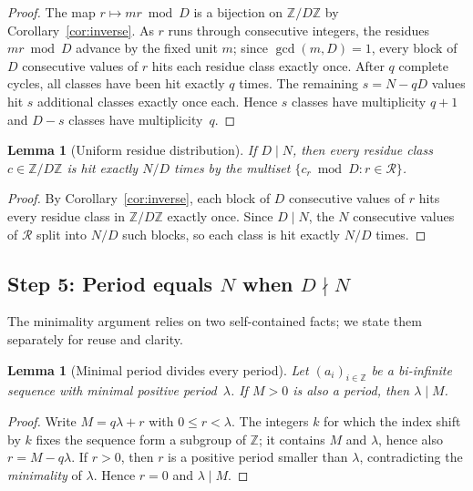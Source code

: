 \documentclass[11pt,reqno]{amsart}
\theoremstyle{plain}
\newtheorem{lemma}[theorem]{Lemma}
\theoremstyle{definition}
\theoremstyle{remark}
\begin{document}
\begin{proof}
The map \(r \mapsto mr \bmod D\) is a bijection on
\(\mathbb{Z}/D\mathbb{Z}\) by Corollary~\ref{cor:inverse}.
As \(r\) runs through consecutive integers, the residues \(mr \bmod D\)
advance by the fixed unit \(m\); since \(\gcd(m, D) = 1\), every block of
\(D\) consecutive values of \(r\) hits each residue class exactly once.
After \(q\) complete cycles, all classes have been hit exactly \(q\) times.
The remaining \(s = N - qD\) values hit \(s\) additional classes exactly once
each.
Hence \(s\) classes have multiplicity \(q + 1\) and \(D - s\) classes have
multiplicity~\(q\).
\end{proof}

\begin{lemma}[Uniform residue distribution]\label{lem:uniform}
If \(D \mid N\), then every residue class \(c \in \mathbb{Z}/D\mathbb{Z}\) is
hit exactly \(N/D\) times by the multiset
\(\{c_r \bmod D : r \in \mathcal{R}\}\).
\end{lemma}

\begin{proof}
By Corollary~\ref{cor:inverse}, each block of \(D\) consecutive values of
\(r\) hits every residue class in \(\mathbb{Z}/D\mathbb{Z}\) exactly once.
Since \(D \mid N\), the \(N\) consecutive values of \(\mathcal{R}\) split
into \(N/D\) such blocks, so each class is hit exactly \(N/D\) times.
\end{proof}

\subsection{\texorpdfstring{Step 5: Period equals \(N\) when \(D \nmid N\)}{Step 5: Period equals N when D does not divide N}}
\label{subsec:step5}

The minimality argument relies on two self-contained facts; we state
them separately for reuse and clarity.

\begin{lemma}[Minimal period divides every period]
\label{lem:minperiod_divides_periods}
Let \((a_i)_{i\in\mathbb Z}\) be a bi-infinite sequence with minimal
positive period~\(\lambda\).  If \(M > 0\) is also a period, then
\(\lambda \mid M\).
\end{lemma}

\begin{proof}
Write \(M = q\lambda + r\) with \(0 \le r < \lambda\).  The integers
\(k\) for which the index shift by \(k\) fixes the sequence form a
subgroup of \(\mathbb{Z}\); it contains \(M\) and \(\lambda\), hence
also \(r = M - q\lambda\).  If \(r > 0\), then \(r\) is a positive
period smaller than \(\lambda\), contradicting the \emph{minimality}
of \(\lambda\).  Hence \(r = 0\) and \(\lambda \mid M\).
\end{proof}
\end{document}
